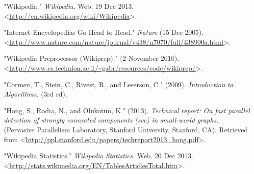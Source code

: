 \documentclass[twoside]{article}
\begin{document}

\begin{thebibliography}{99} %

 "Wikipedia." {\em Wikipedia.}
		Web. 19 Dec 2013. <\url{http://en.wikipedia.org/wiki/Wikipedia}>.
	
 "Internet Encyclopedias Go Head to Head." {\em Nature}
		(15 Dec 2005). <\url{http://www.nature.com/nature/journal/v438/n7070/full/438900a.html}>.

 "Wikipedia Preprocessor (Wikiprep)."
	(2 November 2010). <\url{http://www.cs.technion.ac.il/~gabr/resources/code/wikiprep/}>.

 "Cormen, T., Stein, C., Rivest, R., and Leserson, C." (2009).
	 {\em Introduction to Algorithms.} (3rd ed).
	
 "Hong, S., Rodia, N., and Olukotun, K." (2013).
	{\em Technical report: On fast parallel detection of strongly connected components (scc) in small-world graphs}.
	(Pervasive Parallelism Laboratory, Stanford University, Stanford, CA).
	Retrieved from <\url{http://ppl.stanford.edu/papers/techreport2013_hong.pdf}>.
	
 "Wikipedia Statistics." {\em Wikipedia Statistics.}
		Web. 20 Dec 2013. <\url{http://stats.wikimedia.org/EN/TablesArticlesTotal.htm}>.



\end{thebibliography}

\end{document}

